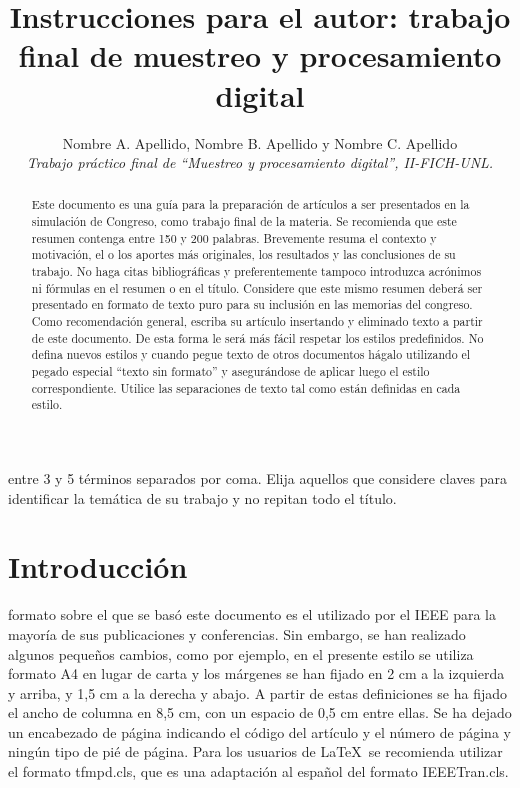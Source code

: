 \documentclass[conference,a4paper,10pt,oneside,final]{tfmpd}
\begin{document}
\title{Instrucciones para el autor: trabajo final de muestreo y procesamiento digital}

\author{Nombre A. Apellido,
        Nombre B. Apellido y 
        Nombre C. Apellido \\
\textit{Trabajo práctico final de ``Muestreo y procesamiento digital'', II-FICH-UNL.}}


\maketitle

\begin{abstract}
Este documento es una guía para la preparación de artículos a ser presentados en la simulación de Congreso, como trabajo final de la materia. Se recomienda que este resumen contenga entre 150 y 200 palabras. Brevemente resuma el contexto y motivación, el o los aportes más originales, los resultados y las conclusiones de su trabajo. No haga citas bibliográficas y preferentemente tampoco introduzca acrónimos ni fórmulas en el resumen o en el título. Considere que este mismo resumen deberá ser presentado en formato de texto puro para su inclusión en las memorias del congreso. Como 
recomendación general, escriba su artículo insertando y eliminado texto a partir de este documento. De esta forma le será más fácil respetar los estilos predefinidos. No defina nuevos estilos y cuando pegue texto de otros documentos hágalo utilizando el pegado especial ``texto sin formato'' y asegurándose de aplicar luego el estilo correspondiente. Utilice las separaciones de texto tal como están definidas en cada estilo.
\end{abstract}

\begin{keywords}
entre 3 y 5 términos separados por coma. Elija aquellos que considere claves para identificar la 
temática de su trabajo y no repitan todo el título.
\end{keywords}

\section{Introducción}

 formato sobre el que se basó este documento es el utilizado por el IEEE para la mayoría de sus publicaciones y conferencias. Sin embargo, se han realizado algunos pequeños cambios, como por ejemplo, en el presente estilo se utiliza formato A4 en lugar de carta y los márgenes se han fijado en 2 cm a la izquierda y arriba, y 1,5 cm a la derecha y abajo. A partir de estas definiciones se ha fijado el ancho de columna en 8,5 cm, con un espacio de 0,5 cm entre ellas. Se ha dejado un encabezado de página indicando el código del artículo y el número de página y ningún tipo de pié de página. Para los usuarios de \LaTeX\ se recomienda utilizar el formato tfmpd.cls, que es una adaptación al español del formato IEEETran.cls.
\end{document}
